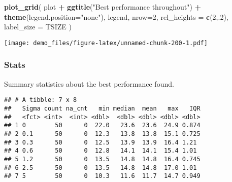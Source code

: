 \documentclass[]{book}
\newenvironment{Shaded}{\begin{snugshade}}{\end{snugshade}}
\newcommand{\DataTypeTok}[1]{\textcolor[rgb]{0.13,0.29,0.53}{#1}}
\newcommand{\DecValTok}[1]{\textcolor[rgb]{0.00,0.00,0.81}{#1}}
\newcommand{\KeywordTok}[1]{\textcolor[rgb]{0.13,0.29,0.53}{\textbf{#1}}}
\newcommand{\NormalTok}[1]{#1}
\newcommand{\OperatorTok}[1]{\textcolor[rgb]{0.81,0.36,0.00}{\textbf{#1}}}
\newcommand{\OtherTok}[1]{\textcolor[rgb]{0.56,0.35,0.01}{#1}}
\newcommand{\StringTok}[1]{\textcolor[rgb]{0.31,0.60,0.02}{#1}}
\begin{document}
\begin{Shaded}
\begin{Highlighting}[]
\KeywordTok{plot_grid}\NormalTok{(}
\NormalTok{  plot }\OperatorTok{+}
\StringTok{    }\KeywordTok{ggtitle}\NormalTok{(}\StringTok{"Best performance throughout"}\NormalTok{) }\OperatorTok{+}
\StringTok{    }\KeywordTok{theme}\NormalTok{(}\DataTypeTok{legend.position=}\StringTok{"none"}\NormalTok{),}
\NormalTok{  legend,}
  \DataTypeTok{nrow=}\DecValTok{2}\NormalTok{,}
  \DataTypeTok{rel_heights =} \KeywordTok{c}\NormalTok{(}\DecValTok{2}\NormalTok{,.}\DecValTok{2}\NormalTok{),}
  \DataTypeTok{label_size =}\NormalTok{ TSIZE}
\NormalTok{)}
\end{Highlighting}
\end{Shaded}

\texttt{[image: demo\_files/figure-latex/unnamed-chunk-200-1.pdf]}

\hypertarget{stats-38}{%
\subsubsection{Stats}\label{stats-38}}

Summary statistics about the best performance found.

\begin{Shaded}
\end{Shaded}

\begin{verbatim}
## # A tibble: 7 x 8
##   Sigma count na_cnt   min median  mean   max   IQR
##   <fct> <int>  <int> <dbl>  <dbl> <dbl> <dbl> <dbl>
## 1 0        50      0  22.0   23.6  23.6  24.9 0.874
## 2 0.1      50      0  12.3   13.8  13.8  15.1 0.725
## 3 0.3      50      0  12.5   13.9  13.9  16.4 1.21 
## 4 0.6      50      0  12.8   14.1  14.1  15.4 1.01 
## 5 1.2      50      0  13.5   14.8  14.8  16.4 0.745
## 6 2.5      50      0  13.5   14.8  14.8  17.0 1.01 
## 7 5        50      0  10.3   11.6  11.7  14.7 0.949
\end{verbatim}
\end{document}

